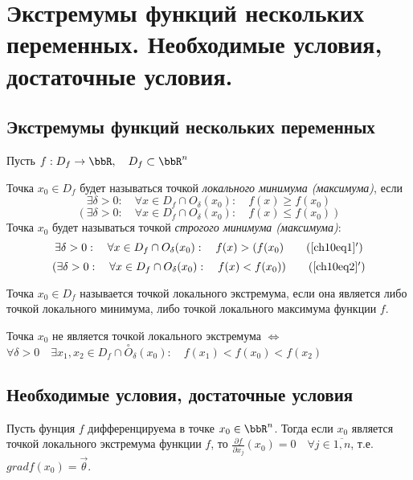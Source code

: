 \chapter{Экстремумы функций нескольких переменных. Необходимые условия, достаточные условия.}
\section{Экстремумы функций нескольких переменных}

Пусть $f: D_f \to \bbR, \quad D_f \subset \bbR^n$

\begin{defn}
Точка $x_0 \in D_f$ будет называться точкой \textit{локального минимума (максимума)}, если 
\begin{equation} \label{ch10eq1}
\exists \delta > 0: \quad \forall x \in D_f \cap O_\delta(x_0): \quad f(x) \ge f(x_0)
\end{equation} 
\begin{equation} \label{ch10eq2}
(\exists \delta > 0: \quad \forall x \in D_f \cap O_\delta(x_0): \quad f(x) \le f(x_0))
\end{equation} 
 Точка $x_0$ будет называться точкой \textit{строгого минимума (максимума)}:
 \begin{equation} \label{ch10eq1'}
\exists \delta > 0: \quad \forall x \in D_f \cap O_\delta(x_0): \quad f(x) > (f(x_0)
\tag{\ref{ch10eq1}$'$} 
\end{equation} 
\begin{equation} \label{ch10eq2'}
(\exists \delta > 0: \quad \forall x \in D_f \cap O_\delta(x_0): \quad f(x) < f(x_0))
\tag{\ref{ch10eq2}$'$} 
\end{equation} 
\end{defn}

\begin{defn}
Точка $x_0 \in D_f$ называется точкой локального экстремума, если она является либо точкой локального минимума, либо точкой локального максимума функции $f$.

Точка $x_0$ не является точкой локального экстремума $\Leftrightarrow$ $\forall \delta > 0 \quad \exists x_1, x_2 \in D_f \cap \overset{\circ}{O}_\delta(x_0): \quad f(x_1) < f(x_0) < f(x_2)$
\end{defn}
\section{Необходимые условия, достаточные условия}

\begin{thm} \label{ch10thm1}
Пусть фунция $f$ дифференцируема в точке $x_0 \in \bbR^n$. Тогда если $x_0$ является точкой локального экстремума функции $f$, то $\frac{\partial f}{\partial x_j}(x_0) = 0 \quad \forall j \in \overline{1,n}$, т.е. $grad f(x_0) = \overset{\rightarrow}{\theta}.$
\end{thm}

